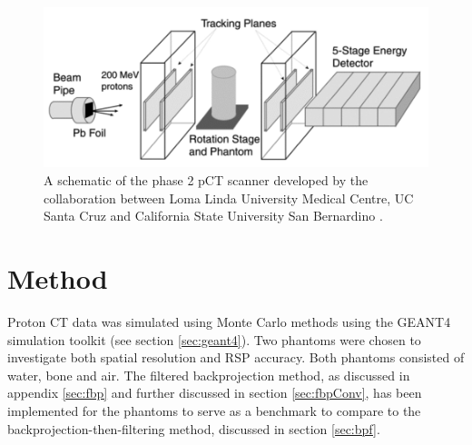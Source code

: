 \documentclass[11pt,a4paper]{article}
\begin{document}
\begin{figure}[!h]
\centering
\includegraphics[scale=0.3]{img/pCTScanner4.png}
\caption{A schematic of the phase 2 pCT scanner developed by the collaboration between Loma Linda University Medical Centre, UC Santa Cruz and California State University San Bernardino \cite{johnson2015fast}.}
\label{fig:pCTScanner}
\end{figure}

\section{Method}
Proton CT data was simulated using Monte Carlo methods using the GEANT4 simulation toolkit (see section \ref{sec:geant4}). Two phantoms were chosen to investigate both spatial resolution and RSP accuracy. Both phantoms consisted of water, bone and air. The filtered backprojection method, as discussed in appendix \ref{sec:fbp} and further discussed in section \ref{sec:fbpConv}, has been implemented for the phantoms to serve as a benchmark to compare to the backprojection-then-filtering method, discussed in section \ref{sec:bpf}. 
\end{document}
